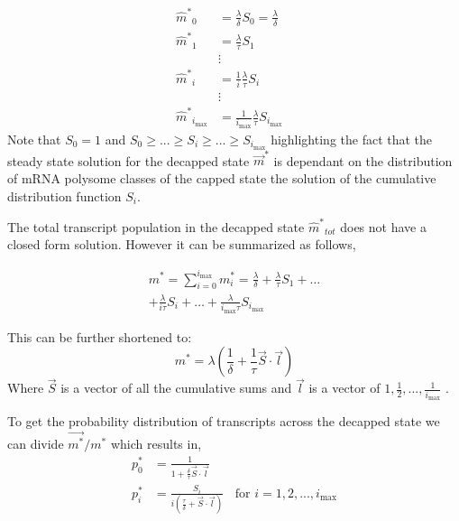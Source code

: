 \documentclass[10pt,letterpaper]{article}
\newcommand{\imax}{\ensuremath{{i_{\max}}}\xspace}
\newcommand{\mhat}{\ensuremath{\hat{m}}\xspace}
\newcommand{\mhatstar}{\ensuremath{\mhat^{*}}\xspace}
\newcommand{\mvec}{\ensuremath{\vec{m}}\xspace}
\newcommand{\mvecstar}{\ensuremath{\mvec^*}\xspace}
\newcommand{\msumstar}{\ensuremath{m^*}\xspace}
\begin{document}
\begin{align}
\label{eq:decapped_solution} 
\mhatstar_0  &= \frac{\lambda}{\delta}S_{0}=\frac{\lambda}{\delta} \nonumber \\
\mhatstar_1  &= \frac{\lambda}{\tau}S_{1} \nonumber \\
& \vdots &  \\
\mhatstar_i  &= \frac{1}{i}\frac{\lambda}{\tau}S_{i}  \nonumber \\
& \vdots & \nonumber \\
\mhatstar_{\imax}  &= \frac{1}{\imax}\frac{\lambda}{\tau}S_{\imax}  \nonumber
\end{align}
 Note that $S_{0}=1$ and $ S_{0} \ge ... \ge S_{i} \ge ... \ge S_{\imax}$ highlighting the fact that the steady state solution for the decapped state \mvecstar is dependant on the distribution of mRNA polysome classes of the capped state the solution of the cumulative distribution function $S_i$. %

The total transcript population in the decapped state $\mhatstar_{tot}$ does not have a closed form solution. However it can be summarized as follows,


\begin{align*}
	\msumstar = \sum_{i=0}^{\imax} m_{i}^{*} = \frac{\lambda}{\delta} + \frac{\lambda}{\tau}S_{1}+ \hdots \\
 + \frac{\lambda}{i \tau}S_{i} + \hdots  + \frac{\lambda}{\imax \tau}S_{\imax} 
\end{align*}

This can be further shortened to:
\begin{equation} \label{eq: marked_total_pop}
	\msumstar = \lambda(\frac{1}{\delta} + \frac{1}{\tau}\vec{S} \cdot \vec{l}	) 
\end{equation}
Where $\vec{S}$ is a vector of all the cumulative sums and $\vec{l}$ is a vector of $1,\frac{1}{2},...,\frac{1}{\imax}$ . 


To get the probability distribution of transcripts across the decapped state we can divide $\vec{m^{*}}/\msumstar$ which results in,
\begin{align}\label{eq:decapped_distribution}
	p_{0}^{*} &= \frac{1}{1 + \frac{\delta}{\tau}\vec{S} \cdot \vec{l}}	\\
  	p_{i}^{*} &= \frac{S_{i}}{i(\frac{\tau}{\delta} + \vec{S} \cdot \vec{l})}	\:\:\:\: \text{for } i=1, 2, ..., \imax
\end{align}
\end{document}
